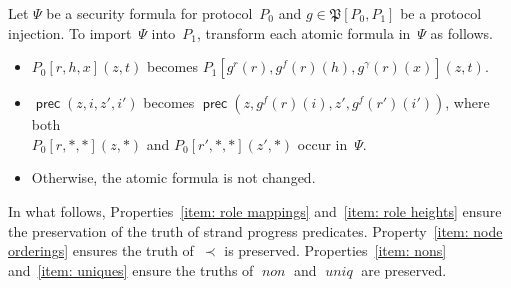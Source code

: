 \documentclass[12pt]{article}
\newcommand{\cn}[1]{\ensuremath{\operatorname{\mathsf{#1}}}}
\newcommand{\fn}[1]{\ensuremath{\operatorname{\mathit{#1}}}}
\newcommand{\alg}[1]{\ensuremath{\mathfrak{#1}}}
\begin{document}
Let $\Psi$ be a security formula for protocol~$P_0$ and
$g\in\alg{P}[P_0,P_1]$ be a protocol injection.  To import~$\Psi$
into~$P_1$, transform each atomic formula in~$\Psi$ as follows.
\begin{itemize}
\item $P_0[r,h,x](z, t)$ becomes
  $P_1[g^r(r),g^f(r)(h),g^\gamma(r)(x)](z,t)$.
\item $\cn{prec}(z,i,z',i')$ becomes
  $\cn{prec}(z,g^f(r)(i),z',g^f(r')(i'))$, where both\\
  $P_0[r,\ast,\ast](z,\ast)$ and
  $P_0[r',\ast,\ast](z',\ast)$ occur in~$\Psi$.
\item Otherwise, the atomic formula is not changed.
\end{itemize}

In what follows, Properties~\ref{item: role mappings} and~\ref{item:
  role heights} ensure the preservation of the truth of strand
progress predicates.  Property~\ref{item: node orderings} ensures the
truth of~$\prec$ is preserved.  Properties~\ref{item: nons}
and~\ref{item: uniques} ensure the truths of \fn{non} and \fn{uniq}
are preserved.
\end{document}
